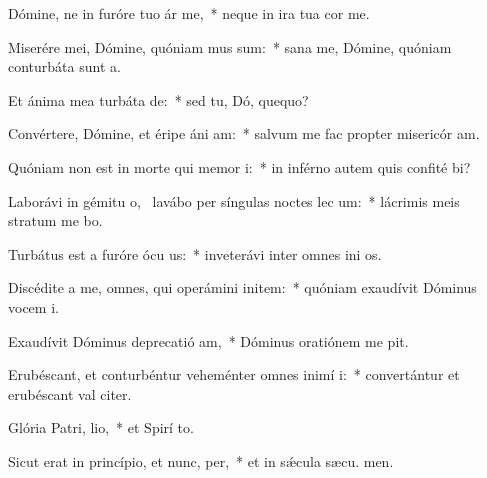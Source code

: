 \item Dómine, ne in furóre tuo ár me,~* neque in ira tua cor me.
\item Miserére mei, Dómine, quóniam mus sum:~* sana me, Dómine, quóniam conturbáta sunt  a.
\item Et ánima mea turbáta  de:~* sed tu, Dó, quequo?
\item Convértere, Dómine, et éripe áni am:~* salvum me fac propter misericór am.
\item Quóniam non est in morte qui memor  i:~* in inférno autem quis confité bi?
\item Laborávi in gémitu o,~\pscross{} lavábo per síngulas noctes lec um:~* lácrimis meis stratum me bo.
\item Turbátus est a furóre ócu us:~* inveterávi inter omnes ini os.
\item Discédite a me, omnes, qui operámini initem:~* quóniam exaudívit Dóminus vocem  i.
\item Exaudívit Dóminus deprecatió am,~* Dóminus oratiónem me pit.
\item Erubéscant, et conturbéntur veheménter omnes inimí i:~* convertántur et erubéscant val citer.
\item Glória Patri,  lio,~* et Spirí to.
\item Sicut erat in princípio, et nunc,  per,~* et in sǽcula sæcu. men.
